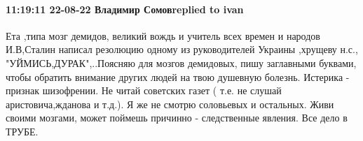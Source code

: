  
 
 
 
 

\paragraph{11:19:11 22-08-22 Владимир Сомовreplied to ivan}

Ета ,типа мозг демидов, великий вождь и учитель всех времен и народов
И.В,Сталин написал резолюцию одному из руководителей Украины ,хрущеву н.с.,
"УЙМИСЬ,ДУРАК",..Поясняю для мозгов демидовых, пишу заглавными буквами, чтобы
обратить внимание других людей на твою душевную болезнь. Истерика - признак
шизофрении. Не читай советских газет ( т.е. не слушай аристовича,жданова и
т.д.). Я же не смотрю соловьевых и остальных. Живи своими мозгами, может
поймешь причинно - следственные явления. Все дело в ТРУБЕ.
